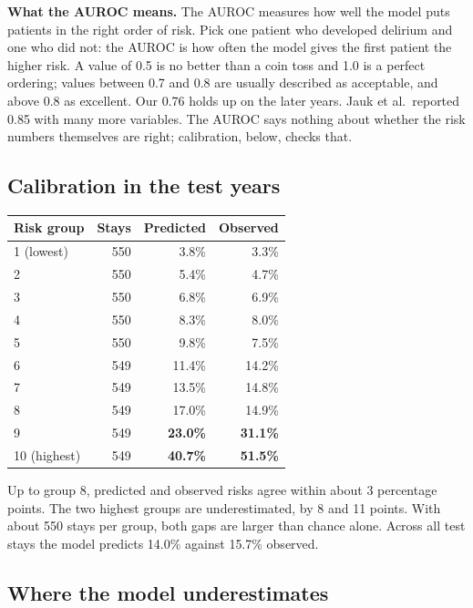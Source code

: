 \documentclass[11pt]{article}
\begin{document}
\textbf{What the AUROC means.} The AUROC measures how well the model puts patients in the right order of risk. Pick one patient who developed delirium and one who did not: the AUROC is how often the model gives the first patient the higher risk. A value of 0.5 is no better than a coin toss and 1.0 is a perfect ordering; values between 0.7 and 0.8 are usually described as acceptable, and above 0.8 as excellent. Our 0.76 holds up on the later years. Jauk et al.\ reported 0.85 with many more variables. The AUROC says nothing about whether the risk numbers themselves are right; calibration, below, checks that.

\subsection*{Calibration in the test years}

\begin{center}
\begin{tabular}{l r r r}
	\toprule
	Risk group & Stays & Predicted & Observed \\
	\midrule
	1 (lowest) & 550 & 3.8\% & 3.3\% \\
	2 & 550 & 5.4\% & 4.7\% \\
	3 & 550 & 6.8\% & 6.9\% \\
	4 & 550 & 8.3\% & 8.0\% \\
	5 & 550 & 9.8\% & 7.5\% \\
	6 & 549 & 11.4\% & 14.2\% \\
	7 & 549 & 13.5\% & 14.8\% \\
	8 & 549 & 17.0\% & 14.9\% \\
	9 & 549 & \textbf{23.0\%} & \textbf{31.1\%} \\
	10 (highest) & 549 & \textbf{40.7\%} & \textbf{51.5\%} \\
	\bottomrule
\end{tabular}
\end{center}

Up to group 8, predicted and observed risks agree within about 3 percentage points. The two highest groups are underestimated, by 8 and 11 points. With about 550 stays per group, both gaps are larger than chance alone. Across all test stays the model predicts 14.0\% against 15.7\% observed.

\subsection*{Where the model underestimates}
\end{document}
